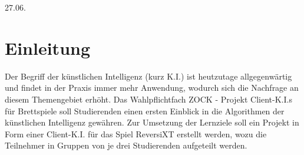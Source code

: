 \documentclass[12pt,a4paper,bibliography=totocnumbered,listof=totocnumbered]{article}
\begin{document}
{27.06.\the\year}

\setcounter{page}{1} 
\tableofcontents
\pagebreak



\renewcommand{\sectionmark}[1]{\markright{#1}}
\renewcommand{\subsectionmark}[1]{}
\renewcommand{\subsubsectionmark}[1]{}
\rhead{\rightmark}

\onehalfspacing
\renewcommand{\thesection}{\arabic{section}}
\renewcommand{\theHsection}{\arabic{section}}
\setcounter{section}{0}
\setcounter{page}{1}

\section{Einleitung} \label{kap:Einleitung}
Der Begriff der \glqq künstlichen Intelligenz\grqq{} (kurz K.I.) ist heutzutage allgegenwärtig und findet in der Praxis immer mehr Anwendung, wodurch sich die Nachfrage an diesem Themengebiet erhöht.\cite{ki} Das Wahlpflichtfach \glqq ZOCK - Projekt Client-K.I.s für Brettspiele\grqq{} soll Studierenden einen ersten Einblick in die Algorithmen der künstlichen Intelligenz gewähren. Zur Umsetzung der Lernziele soll ein Projekt in Form einer Client-K.I. für das Spiel ReversiXT erstellt werden, wozu die Teilnehmer in Gruppen von je drei Studierenden aufgeteilt werden. 
\end{document}
